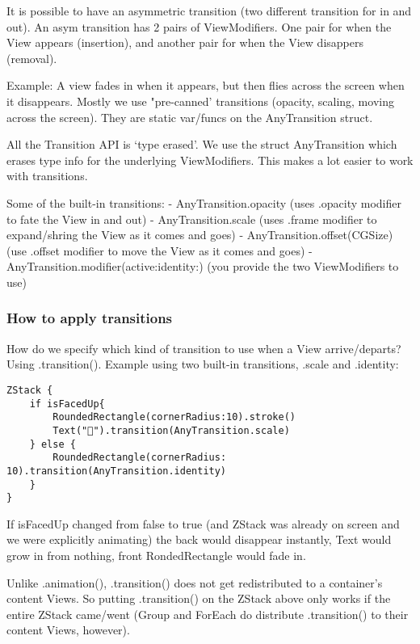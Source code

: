 \documentclass[]{article}
\begin{document}
It is possible to have an asymmetric transition (two different
transition for in and out). An asym transition has 2 pairs of
ViewModifiers. One pair for when the View appears (insertion), and
another pair for when the View disappers (removal).

Example: A view fades in when it appears, but then flies across the
screen when it disappears. Mostly we use "pre-canned' transitions
(opacity, scaling, moving across the screen). They are static var/funcs
on the AnyTransition struct.

All the Transition API is `type erased'. We use the struct AnyTransition
which erases type info for the underlying ViewModifiers. This makes a
lot easier to work with transitions.

Some of the built-in transitions: - AnyTransition.opacity (uses .opacity
modifier to fate the View in and out) - AnyTransition.scale (uses .frame
modifier to expand/shring the View as it comes and goes) -
AnyTransition.offset(CGSize) (use .offset modifier to move the View as
it comes and goes) - AnyTransition.modifier(active:identity:) (you
provide the two ViewModifiers to use)

\hypertarget{how-to-apply-transitions}{%
\subsubsection{How to apply
transitions}\label{how-to-apply-transitions}}

How do we specify which kind of transition to use when a View
arrive/departs? Using .transition(). Example using two built-in
transitions, .scale and .identity:

\begin{verbatim}
ZStack {
    if isFacedUp{
        RoundedRectangle(cornerRadius:10).stroke()
        Text("👻").transition(AnyTransition.scale)
    } else {
        RoundedRectangle(cornerRadius: 10).transition(AnyTransition.identity)
    }
}
\end{verbatim}

If isFacedUp changed from false to true (and ZStack was already on
screen and we were explicitly animating) the back would disappear
instantly, Text would grow in from nothing, front RondedRectangle would
fade in.

Unlike .animation(), .transition() does not get redistributed to a
container's content Views. So putting .transition() on the ZStack above
only works if the entire ZStack came/went (Group and ForEach do
distribute .transition() to their content Views, however).
\end{document}
